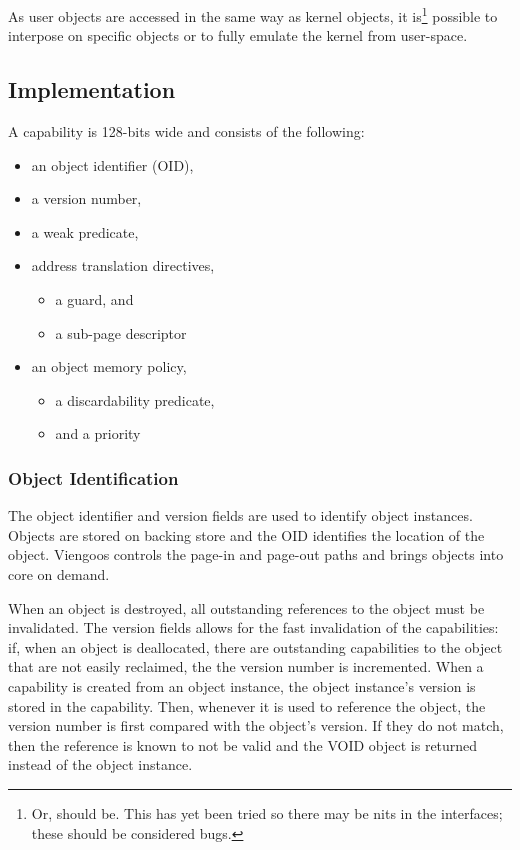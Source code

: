 As user objects are accessed in the same way as kernel objects, it
is\footnote{Or, should be.  This has yet been tried so there may be
  nits in the interfaces; these should be considered bugs.}  possible
to interpose on specific objects or to fully emulate the kernel from
user-space.

\subsection{Implementation}

A capability is 128-bits wide and consists of the following:

\begin{itemize}
\item an object identifier (OID),
\item a version number,
\item a weak predicate,
\item address translation directives,
  \begin{itemize}
  \item a guard, and
  \item a sub-page descriptor
  \end{itemize}
\item an object memory policy,
  \begin{itemize}
  \item a discardability predicate,
  \item and a priority
  \end{itemize}
\end{itemize}

\subsubsection{Object Identification}

The object identifier and version fields are used to identify object
instances.  Objects are stored on backing store and the OID identifies
the location of the object.  Viengoos controls the page-in and
page-out paths and brings objects into core on demand.

When an object is destroyed, all outstanding references to the object
must be invalidated.  The version fields allows for the fast
invalidation of the capabilities: if, when an object is deallocated,
there are outstanding capabilities to the object that are not easily
reclaimed, the the version number is incremented.  When a capability
is created from an object instance, the object instance's version is
stored in the capability.  Then, whenever it is used to reference the
object, the version number is first compared with the object's
version.  If they do not match, then the reference is known to not be
valid and the VOID object is returned instead of the object instance.

